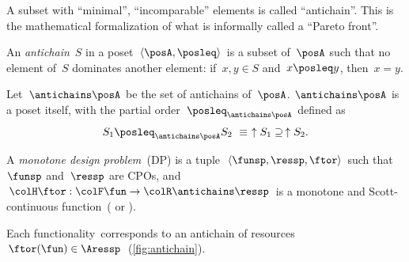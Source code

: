 A subset with ``minimal'', ``incomparable'' elements is called
``antichain''. This is the mathematical formalization of what is
informally called a ``Pareto front''.


\begin{definition}
  An \emph{antichain}~$S$ in a poset~$\left\langle \posA,\posleq\right\rangle $
  is a subset of~$\posA$ such that no element of~$S$ dominates another
  element: if~$x,y\in S$ and~$x\posleq y$, then~$x=y$.
\end{definition}
\begin{lemma}
  Let~$\antichains\posA$ be the set of antichains of~$\posA$. $\antichains\posA$
  is a poset itself, with the partial order~$\posleq_{\antichains\posA}$
  defined as
  \begin{equation}
    S_{1}\posleq_{\antichains\posA}S_{2}\ \equiv\ \uparrow S_{1}\supseteq\,\uparrow S_{2}.\label{eq:orderantichains}
  \end{equation}
\end{lemma}
\begin{definition}
  \label{def:A-monotone-design}A\emph{ monotone design problem~}(DP)
  is a tuple~$\left\langle \funsp,\ressp,\ftor\right\rangle $ such
  that~$\funsp$ and~$\ressp$ are CPOs, and~${\colH\ftor}:{\colF\fun}\rightarrow{\colR\antichains\ressp}$
  is a monotone and Scott-continuous function~(\cite{gierz03continuous}
  or \cite[Definition 11]{censi16codesign_sep16}).
\end{definition}

\noindent Each functionality~\fun corresponds to an antichain
of resources~$\ftor(\fun)\in\Aressp$~(\cref{fig:antichain}).


